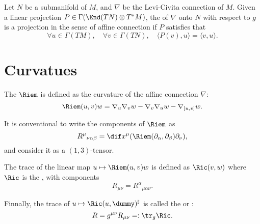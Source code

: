 \documentclass[openany, oneside, a5paper]{book}
\begin{document}
\begin{definition}
    Let $N$ be a submanifold of $M$, and $\nabla$ be the Levi-Civita connection of $M$.
    Given a linear projection $P \in \Gamma(\End(TN) \otimes T^*M)$,
    the  of $\nabla$ onto $N$ with respect to $g$ is a projection in the sense of affine connection if $P$ satisfies that
    \begin{equation}
        \forall u \in \Gamma(TM), \quad
        \forall v \in \Gamma(TN), \quad
        \langle P(v), u \rangle = \langle v, u \rangle.
    \end{equation}
\end{definition}


\section{Curvatues}

The  $\Riem$ is defined as the curvature of the affine connection $\nabla$:
\begin{equation}
    \Riem(u, v) w = \nabla_u \nabla_v w - \nabla_v \nabla_u w - \nabla_{[u, v]} w.
\end{equation}

It is conventional to write the components of $\Riem$ as
\begin{equation}
    {R^\mu}_{\nu\alpha\beta} = \dif x^\mu (\Riem(\partial_\alpha, \partial_\beta) \partial_\nu), 
\end{equation}
and consider it as a $(1, 3)$-tensor.

The trace of the linear map $u \mapsto \Riem(u, v) w$ is defined as $\Ric(v, w)$ where $\Ric$ is the , with components
\begin{equation}
    R_{\mu\nu} = {R^\alpha}_{\mu\alpha\nu}.
\end{equation}

Finnally, the trace of $u \mapsto \Ric(u, \dummy)^\sharp$ is called the  or :
\begin{equation}
    R = g^{\mu\nu} R_{\mu\nu} =: \tr_g \Ric.
\end{equation}

\backmatter{}
\nocite{*} %
\printbibliography[heading=bibliography, title={bibliography}]

\printindex[symbol]

\printindex
\end{document}

